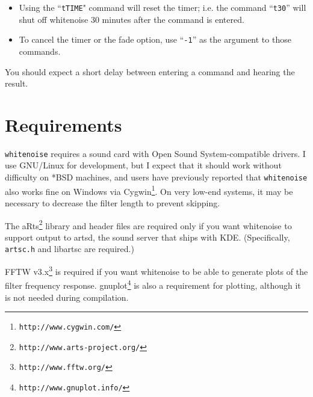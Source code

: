 \documentclass[12pt,oneside,notitlepage]{article}
\begin{document}
\begin{itemize}
   \item Using the ``{\tt tTIME}" command will reset the timer; i.e. the command ``{\tt t30}''
     will shut off whitenoise 30 minutes after the command is entered.
  \item To cancel the timer or the fade option, use ``{\tt -1}'' as the argument to those
     commands.
\end{itemize}

You should expect a short delay between entering a command and hearing the
result.


\section{Requirements}
{\tt whitenoise} requires a sound card with Open Sound System-compatible
drivers.  I use GNU/Linux for development, but I expect that it should work
without difficulty on *BSD machines, and users have previously reported that
{\tt whitenoise} also works fine on Windows via 
Cygwin\footnote{ {\tt http://www.cygwin.com/}}.
On very low-end systems, it may
be necessary to decrease the filter length to prevent skipping.

The 
aRts\footnote{ {\tt http://www.arts-project.org/} }
library and header files 
are required only if you want whitenoise to support output to artsd, the sound
server that ships with KDE.  (Specifically, {\tt artsc.h} and libartsc are
required.)

FFTW v3.x\footnote{ {\tt http://www.fftw.org/} }
is required if you want whitenoise
to be able to generate plots of the filter frequency response. 
gnuplot\footnote{ {\tt http://www.gnuplot.info/} }
is also a requirement for plotting, although it is not needed during compilation.
\end{document}
